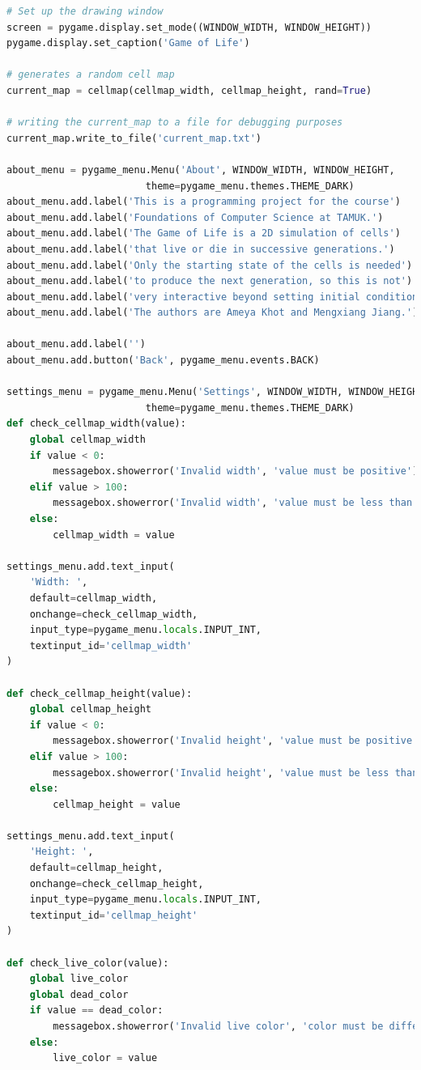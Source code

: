 \documentclass[12pt]{report}
\begin{document}
\begin{lstlisting}[language=Python, caption=game\_of\_life.py]
# Set up the drawing window
screen = pygame.display.set_mode((WINDOW_WIDTH, WINDOW_HEIGHT))
pygame.display.set_caption('Game of Life')

# generates a random cell map
current_map = cellmap(cellmap_width, cellmap_height, rand=True)

# writing the current_map to a file for debugging purposes
current_map.write_to_file('current_map.txt')

about_menu = pygame_menu.Menu('About', WINDOW_WIDTH, WINDOW_HEIGHT,
                        theme=pygame_menu.themes.THEME_DARK)
about_menu.add.label('This is a programming project for the course')
about_menu.add.label('Foundations of Computer Science at TAMUK.')
about_menu.add.label('The Game of Life is a 2D simulation of cells')
about_menu.add.label('that live or die in successive generations.')
about_menu.add.label('Only the starting state of the cells is needed')
about_menu.add.label('to produce the next generation, so this is not')
about_menu.add.label('very interactive beyond setting initial conditions.')
about_menu.add.label('The authors are Ameya Khot and Mengxiang Jiang.')

about_menu.add.label('')
about_menu.add.button('Back', pygame_menu.events.BACK)

settings_menu = pygame_menu.Menu('Settings', WINDOW_WIDTH, WINDOW_HEIGHT,
                        theme=pygame_menu.themes.THEME_DARK)
def check_cellmap_width(value):
    global cellmap_width
    if value < 0:
        messagebox.showerror('Invalid width', 'value must be positive')
    elif value > 100:
        messagebox.showerror('Invalid width', 'value must be less than 100')
    else:
        cellmap_width = value

settings_menu.add.text_input(
    'Width: ',
    default=cellmap_width,
    onchange=check_cellmap_width,
    input_type=pygame_menu.locals.INPUT_INT,
    textinput_id='cellmap_width'
)

def check_cellmap_height(value):
    global cellmap_height
    if value < 0:
        messagebox.showerror('Invalid height', 'value must be positive')
    elif value > 100:
        messagebox.showerror('Invalid height', 'value must be less than 100')
    else:
        cellmap_height = value

settings_menu.add.text_input(
    'Height: ',
    default=cellmap_height,
    onchange=check_cellmap_height,
    input_type=pygame_menu.locals.INPUT_INT,
    textinput_id='cellmap_height'
)

def check_live_color(value):
    global live_color
    global dead_color
    if value == dead_color:
        messagebox.showerror('Invalid live color', 'color must be different from dead color')
    else:
        live_color = value


\end{lstlisting}
\end{document}
